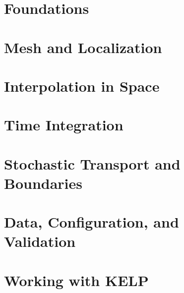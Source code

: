 \documentclass[11pt,oneside]{book}
\begin{document}
\frontmatter


\tableofcontents
\listoffigures



\mainmatter
\part{Foundations}



\part{Mesh and Localization}



\part{Interpolation in Space}





\part{Time Integration}




\part{Stochastic Transport and Boundaries}



\part{Data, Configuration, and Validation}





\part{Working with KELP}


\appendix





\backmatter


\printindex
\end{document}
